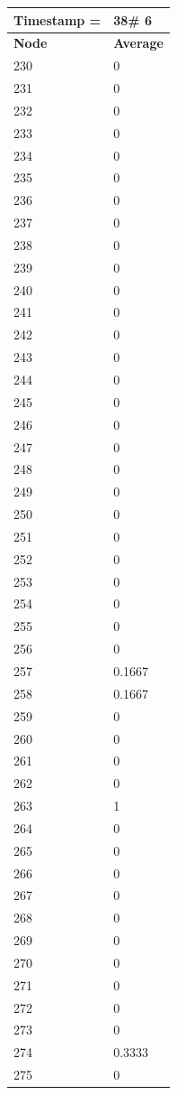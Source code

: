 \begin{tabular}{|l||l|}
\hline
\textbf{Timestamp =} & \textbf{38}\# 6\\\hline
	\textbf{Node} & \textbf{Average} \\ \hline
\hline
	230 & 0 \\ \hline
	231 & 0 \\ \hline
	232 & 0 \\ \hline
	233 & 0 \\ \hline
	234 & 0 \\ \hline
	235 & 0 \\ \hline
	236 & 0 \\ \hline
	237 & 0 \\ \hline
	238 & 0 \\ \hline
	239 & 0 \\ \hline
	240 & 0 \\ \hline
	241 & 0 \\ \hline
	242 & 0 \\ \hline
	243 & 0 \\ \hline
	244 & 0 \\ \hline
	245 & 0 \\ \hline
	246 & 0 \\ \hline
	247 & 0 \\ \hline
	248 & 0 \\ \hline
	249 & 0 \\ \hline
	250 & 0 \\ \hline
	251 & 0 \\ \hline
	252 & 0 \\ \hline
	253 & 0 \\ \hline
	254 & 0 \\ \hline
	255 & 0 \\ \hline
	256 & 0 \\ \hline
	257 & 0.1667 \\ \hline
	258 & 0.1667 \\ \hline
	259 & 0 \\ \hline
	260 & 0 \\ \hline
	261 & 0 \\ \hline
	262 & 0 \\ \hline
	263 & 1 \\ \hline
	264 & 0 \\ \hline
	265 & 0 \\ \hline
	266 & 0 \\ \hline
	267 & 0 \\ \hline
	268 & 0 \\ \hline
	269 & 0 \\ \hline
	270 & 0 \\ \hline
	271 & 0 \\ \hline
	272 & 0 \\ \hline
	273 & 0 \\ \hline
	274 & 0.3333 \\ \hline
	275 & 0 \\ \hline
\end{tabular}

